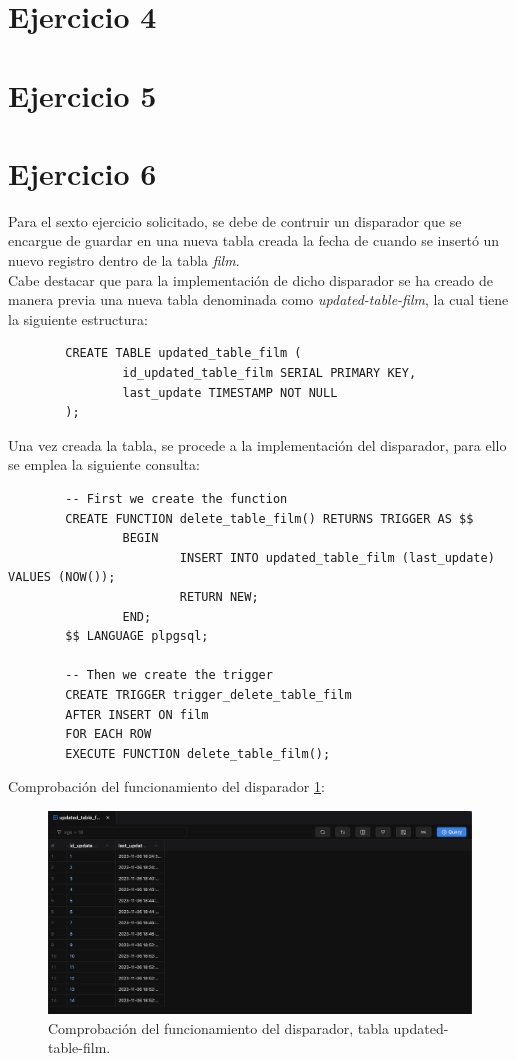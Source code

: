 \documentclass{report}
\begin{document}
	\section{Ejercicio 4}

	\section{Ejercicio 5}

	\section{Ejercicio 6}
	Para el sexto ejercicio solicitado, se debe de contruir un disparador que se encargue de guardar en una nueva tabla creada la fecha de cuando se insertó un nuevo registro dentro de la tabla \emph{film}.\\

	Cabe destacar que para la implementación de dicho disparador se ha creado de manera previa una nueva tabla denominada como \emph{updated-table-film}, la cual tiene la siguiente estructura:

	\begin{verbatim}
		CREATE TABLE updated_table_film (
				id_updated_table_film SERIAL PRIMARY KEY,
				last_update TIMESTAMP NOT NULL
		);
	\end{verbatim}

	Una vez creada la tabla, se procede a la implementación del disparador, para ello se emplea la siguiente consulta:

	\begin{verbatim}
		-- First we create the function
		CREATE FUNCTION delete_table_film() RETURNS TRIGGER AS $$
				BEGIN
						INSERT INTO updated_table_film (last_update) VALUES (NOW());
						RETURN NEW;
				END;
		$$ LANGUAGE plpgsql;

		-- Then we create the trigger
		CREATE TRIGGER trigger_delete_table_film
		AFTER INSERT ON film
		FOR EACH ROW
		EXECUTE FUNCTION delete_table_film();
	\end{verbatim}

	Comprobación del funcionamiento del disparador \ref{fig:Exercice-6}:

	\begin{figure}[H]
		\centering
		\includegraphics[scale=0.5]{img/Exercice-6-Comprobation.png}
		\caption{Comprobación del funcionamiento del disparador, tabla updated-table-film.}
		\label{fig:Exercice-6}
	\end{figure}
\end{document}
